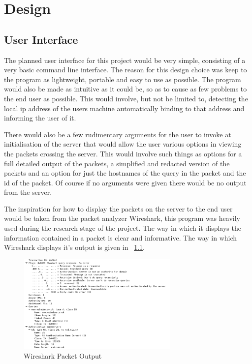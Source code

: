 \documentclass{l3proj}
\begin{document}
\chapter{Design}
\label{design}

\section{User Interface}

The planned user interface for this project would be very simple, consisting of a very basic command line interface. The reason for this design choice was keep to the program as lightweight, portable and easy to use as possible. The program would also be made as intuitive as it could be, so as to cause as few problems to the end user as possible. This would involve, but not be limited to, detecting the local ip address of the users machine automatically binding to that address and informing the user of it.

There would also be a few rudimentary arguments for the user to invoke at initialisation of the server that would allow the user various options in viewing the packets crossing the server. This would involve such things as options for a full detailed output of the packets, a simplified and redacted version of the packets and an option for just the hostnames of the query in the packet and the id of the packet. Of course if no arguments were given there would be no output from the server.

The inspiration for how to display the packets on the server to the end user would be taken from the packet analyzer Wireshark, this program was heavily used during the research stage of the project. The way in which it displays the information contained in a packet is clear and informative. The way in which Wireshark displays it's output is given in ~\ref{fig:packet_output}.

\begin{figure}[h]
    \centering
    \includegraphics[width=0.7\textwidth]{images/packet_output.png}
    \caption{Wireshark Packet Output}
    \label{fig:packet_output}
\end{figure}
\end{document}
